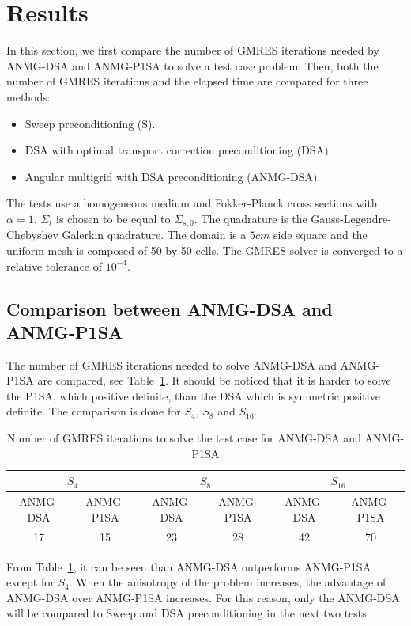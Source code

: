 \documentclass[preprint,10pt]{elsarticle}
\renewcommand{\(}{\left(}
\renewcommand{\)}{\right)}
\renewcommand{\[}{\left[}
\renewcommand{\]}{\right]}
\newcommand{\tbl}[1]{Table~\ref{#1}}                     %
\begin{document}
\section{Results} \label{sec:results}

In this section, we first compare the number of GMRES iterations needed by 
ANMG-DSA and ANMG-P1SA to solve a test case problem. Then, both the number of GMRES 
iterations and the elapsed time are compared for three methods:
\begin{itemize}
\item Sweep preconditioning (S).
\item DSA with optimal transport correction preconditioning (DSA).
\item Angular multigrid with DSA preconditioning (ANMG-DSA).
\end{itemize}
The tests use a homogeneous medium and Fokker-Planck cross
sections with $\alpha=1$. $\Sigma_{t}$ is chosen to be equal to
$\Sigma_{s,0}$. The quadrature is the Gauss-Legendre-Chebyshev Galerkin
quadrature. The domain is a $5cm$ side square and the uniform mesh is composed
of 50 by 50 
cells. The GMRES solver is converged to a relative tolerance of $10^{-4}$.

\subsection{Comparison between ANMG-DSA and ANMG-P1SA}

The number of GMRES iterations needed to solve ANMG-DSA and
ANMG-P1SA are compared, see \tbl{tab:1}. It should be noticed that it is
harder to solve the P1SA, which positive definite, than the DSA which is
symmetric positive definite. The comparison is done for $S_4$, $S_8$ and
$S_{16}$. 
\begin{table}[H]
\begin{center}
\begin{tabular}{|c|c|c|c|c|c|}
\hline
\multicolumn{2}{|c|}{$S_4$} & \multicolumn{2}{c|}{$S_8$} &
\multicolumn{2}{c|}{$S_{16}$}\\
\hline
ANMG-DSA & ANMG-P1SA & ANMG-DSA & ANMG-P1SA & ANMG-DSA & ANMG-P1SA\\
\hline
17 &  15 & 23 & 28 & 42 & 70\\
\hline
\end{tabular}
\caption{Number of GMRES iterations to solve the test case for ANMG-DSA and
ANMG-P1SA}
\label{tab:1}
\end{center}
\end{table}
%
From \tbl{tab:1}, it can be seen than ANMG-DSA outperforms ANMG-P1SA except for
$S_4$. When the anisotropy of the problem increases, the advantage of ANMG-DSA
over ANMG-P1SA increases. For this reason, only the ANMG-DSA will be compared
to Sweep and DSA preconditioning in the next two tests.
\end{document}
